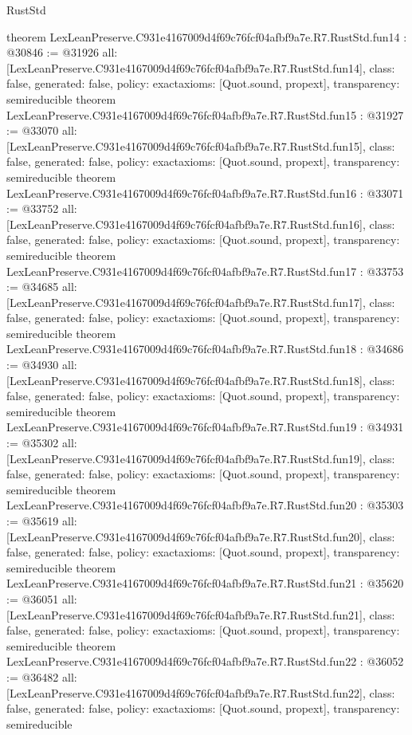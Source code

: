 \begin{lexlean}{RustStd}
\begin{coremodule}
{}
theorem LexLeanPreserve.C931e4167009d4f69c76fcf04afbf9a7e.R7.RustStd.fun14 : @30846 := @31926 {
  all: [LexLeanPreserve.C931e4167009d4f69c76fcf04afbf9a7e.R7.RustStd.fun14],
  class: false,
  generated: false,
  policy: exact{axioms: [Quot.sound, propext]},
  transparency: semireducible
}
theorem LexLeanPreserve.C931e4167009d4f69c76fcf04afbf9a7e.R7.RustStd.fun15 : @31927 := @33070 {
  all: [LexLeanPreserve.C931e4167009d4f69c76fcf04afbf9a7e.R7.RustStd.fun15],
  class: false,
  generated: false,
  policy: exact{axioms: [Quot.sound, propext]},
  transparency: semireducible
}
theorem LexLeanPreserve.C931e4167009d4f69c76fcf04afbf9a7e.R7.RustStd.fun16 : @33071 := @33752 {
  all: [LexLeanPreserve.C931e4167009d4f69c76fcf04afbf9a7e.R7.RustStd.fun16],
  class: false,
  generated: false,
  policy: exact{axioms: [Quot.sound, propext]},
  transparency: semireducible
}
theorem LexLeanPreserve.C931e4167009d4f69c76fcf04afbf9a7e.R7.RustStd.fun17 : @33753 := @34685 {
  all: [LexLeanPreserve.C931e4167009d4f69c76fcf04afbf9a7e.R7.RustStd.fun17],
  class: false,
  generated: false,
  policy: exact{axioms: [Quot.sound, propext]},
  transparency: semireducible
}
theorem LexLeanPreserve.C931e4167009d4f69c76fcf04afbf9a7e.R7.RustStd.fun18 : @34686 := @34930 {
  all: [LexLeanPreserve.C931e4167009d4f69c76fcf04afbf9a7e.R7.RustStd.fun18],
  class: false,
  generated: false,
  policy: exact{axioms: [Quot.sound, propext]},
  transparency: semireducible
}
theorem LexLeanPreserve.C931e4167009d4f69c76fcf04afbf9a7e.R7.RustStd.fun19 : @34931 := @35302 {
  all: [LexLeanPreserve.C931e4167009d4f69c76fcf04afbf9a7e.R7.RustStd.fun19],
  class: false,
  generated: false,
  policy: exact{axioms: [Quot.sound, propext]},
  transparency: semireducible
}
theorem LexLeanPreserve.C931e4167009d4f69c76fcf04afbf9a7e.R7.RustStd.fun20 : @35303 := @35619 {
  all: [LexLeanPreserve.C931e4167009d4f69c76fcf04afbf9a7e.R7.RustStd.fun20],
  class: false,
  generated: false,
  policy: exact{axioms: [Quot.sound, propext]},
  transparency: semireducible
}
theorem LexLeanPreserve.C931e4167009d4f69c76fcf04afbf9a7e.R7.RustStd.fun21 : @35620 := @36051 {
  all: [LexLeanPreserve.C931e4167009d4f69c76fcf04afbf9a7e.R7.RustStd.fun21],
  class: false,
  generated: false,
  policy: exact{axioms: [Quot.sound, propext]},
  transparency: semireducible
}
theorem LexLeanPreserve.C931e4167009d4f69c76fcf04afbf9a7e.R7.RustStd.fun22 : @36052 := @36482 {
  all: [LexLeanPreserve.C931e4167009d4f69c76fcf04afbf9a7e.R7.RustStd.fun22],
  class: false,
  generated: false,
  policy: exact{axioms: [Quot.sound, propext]},
  transparency: semireducible
}
\end{coremodule}
\end{lexlean}
